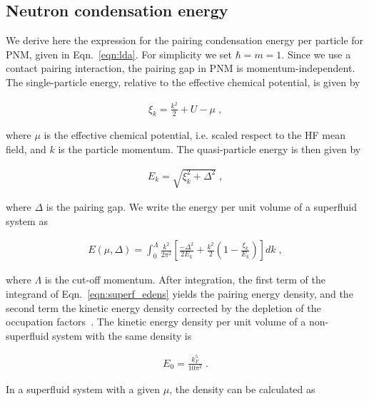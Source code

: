 \documentclass[
    amsmath,amssymb,
    aps,
    prc,
    floatfix,
]{revtex4-2}
\begin{document}
\begin{appendix}

\section{Neutron condensation energy}\label{app:cond}

We derive here the expression for the pairing condensation energy per particle for PNM, given in Eqn.~\ref{eqn:lda}. For simplicity we set $\hbar=m=1$.
Since we use a contact pairing interaction, the pairing gap in PNM is momentum-independent. The single-particle energy, relative to the effective chemical potential, is given by

    \begin{eqnarray}\label{eqn:spke}
        \xi_k = \frac{k^2}{2}+U-\mu\;,
    \end{eqnarray}

\noindent where $\mu$ is the effective chemical potential, i.e. scaled respect to the HF mean field, and $k$ is the particle momentum. The quasi-particle energy is then given by

    \begin{eqnarray}\label{eqn:qpe}
        E_k = \sqrt{\xi_k^2 + \Delta^2}\;,
    \end{eqnarray}

\noindent where $\Delta$ is the pairing gap. We write the energy per unit volume of a superfluid system as

    \begin{eqnarray}\label{eqn:superf_edens}
        E(\mu,\Delta) = \int_0^\Lambda\frac{k^2}{2\pi^2}\left[\frac{-\Delta^2}{2E_k} + \frac{k^2}{2}\left(1-\frac{\xi_k}{E_k}\right)\right]dk\;,
    \end{eqnarray}

\noindent where $\Lambda$ is the cut-off momentum. After integration, the first term of the integrand of Eqn.~\ref{eqn:superf_edens} yields the pairing energy density, and the second term the kinetic energy density corrected by the depletion of the occupation factors~\cite{ring2004nuclear}. The kinetic energy density per unit volume of a non-superfluid system with the same density is

    \begin{eqnarray}\label{eqn:nonsuperf_edens}
        E_0 = \frac{k_F^5}{10\pi^2}\;.
    \end{eqnarray}

\noindent In a superfluid system with a given $\mu$, the density can be calculated as


\end{appendix}
\end{document}
